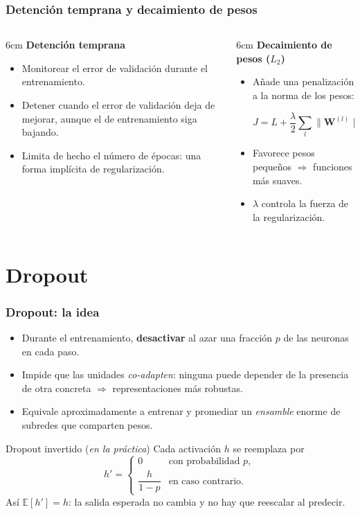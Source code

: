 \documentclass[aspectratio=169, 10pt]{beamer}
\newcommand{\E}{\mathbb{E}}
\newcommand{\W}{\bm{W}}
\newcommand{\formula}[1]{%
	\begin{tcolorbox}[colback=UCMBlue!8, colframe=UCMBlue, arc=4pt,
		boxsep=2pt, left=6pt, right=6pt, top=3pt, bottom=3pt]
		#1
	\end{tcolorbox}
}
\begin{document}
\begin{frame}
\frametitle{Detenci\'on temprana y decaimiento de pesos}
\begin{columns}[T]
\begin{column}{6cm}
\textbf{Detenci\'on temprana}
\begin{itemize}
	\item Monitorear el error de validaci\'on durante el entrenamiento.
	\item Detener cuando el error de validaci\'on deja de mejorar, aunque el de entrenamiento siga bajando.
	\item Limita de hecho el n\'umero de \'epocas: una forma impl\'icita de regularizaci\'on.
\end{itemize}
\end{column}
\begin{column}{6cm}
\textbf{Decaimiento de pesos ($L_2$)}
\begin{itemize}
	\item A\~nade una penalizaci\'on a la norma de los pesos:
	\formula{\[ J = L + \frac{\lambda}{2}\sum_l \|\W^{(l)}\|_F^2. \]}
	\item Favorece pesos peque\~nos $\Rightarrow$ funciones m\'as suaves.
	\item $\lambda$ controla la fuerza de la regularizaci\'on.
\end{itemize}
\end{column}
\end{columns}
\end{frame}

\section{Dropout}

\begin{frame}
\frametitle{Dropout: la idea}
\begin{itemize}
	\item Durante el entrenamiento, \textbf{desactivar} al azar una fracci\'on $p$ de las neuronas en cada paso.
	\pause
	\item Impide que las unidades \emph{co-adapten}: ninguna puede depender de la presencia de otra concreta $\Rightarrow$ representaciones m\'as robustas.
	\pause
	\item Equivale aproximadamente a entrenar y promediar un \emph{ensamble} enorme de subredes que comparten pesos.
\end{itemize}
\pause
\begin{block}{Dropout invertido (\emph{en la pr\'actica})}
Cada activaci\'on $h$ se reemplaza por
\[
h' =
\begin{cases}
0 & \text{con probabilidad } p,\\[2pt]
\dfrac{h}{1-p} & \text{en caso contrario.}
\end{cases}
\]
As\'i $\E[h']=h$: la salida esperada no cambia y no hay que reescalar al predecir.
\end{block}
\end{frame}
\end{document}
